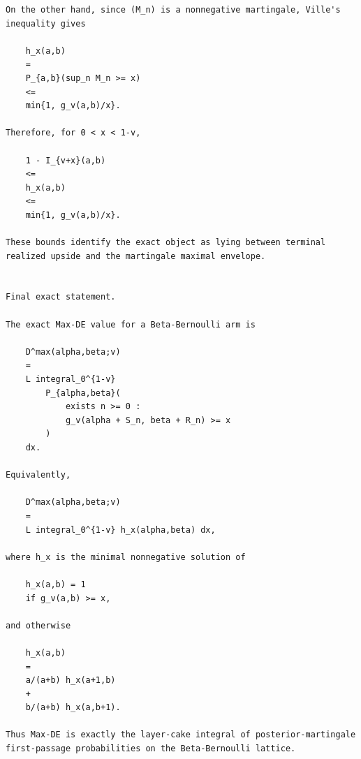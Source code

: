 \begin{small}
\begin{verbatim}
On the other hand, since (M_n) is a nonnegative martingale, Ville's inequality gives

    h_x(a,b)
    =
    P_{a,b}(sup_n M_n >= x)
    <=
    min{1, g_v(a,b)/x}.

Therefore, for 0 < x < 1-v,

    1 - I_{v+x}(a,b)
    <=
    h_x(a,b)
    <=
    min{1, g_v(a,b)/x}.

These bounds identify the exact object as lying between terminal realized upside and the martingale maximal envelope.


Final exact statement.

The exact Max-DE value for a Beta-Bernoulli arm is

    D^max(alpha,beta;v)
    =
    L integral_0^{1-v}
        P_{alpha,beta}(
            exists n >= 0 :
            g_v(alpha + S_n, beta + R_n) >= x
        )
    dx.

Equivalently,

    D^max(alpha,beta;v)
    =
    L integral_0^{1-v} h_x(alpha,beta) dx,

where h_x is the minimal nonnegative solution of

    h_x(a,b) = 1
    if g_v(a,b) >= x,

and otherwise

    h_x(a,b)
    =
    a/(a+b) h_x(a+1,b)
    +
    b/(a+b) h_x(a,b+1).

Thus Max-DE is exactly the layer-cake integral of posterior-martingale first-passage probabilities on the Beta-Bernoulli lattice.
\end{verbatim}
\end{small}
